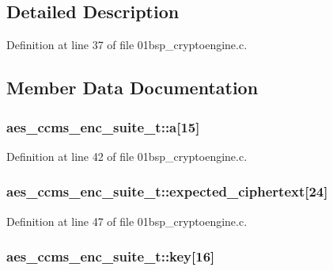 \subsection{Detailed Description}


Definition at line 37 of file 01bsp\+\_\+cryptoengine.\+c.



\subsection{Member Data Documentation}
\subsubsection[{\texorpdfstring{a}{a}}]{ aes\+\_\+ccms\+\_\+enc\+\_\+suite\+\_\+t\+::a\mbox{[}15\mbox{]}}\hypertarget{structaes__ccms__enc__suite__t_a2a300c3f4e7f798480b98527aa89895b}{}\label{structaes__ccms__enc__suite__t_a2a300c3f4e7f798480b98527aa89895b}


Definition at line 42 of file 01bsp\+\_\+cryptoengine.\+c.

\subsubsection[{\texorpdfstring{expected\+\_\+ciphertext}{expected_ciphertext}}]{ aes\+\_\+ccms\+\_\+enc\+\_\+suite\+\_\+t\+::expected\+\_\+ciphertext\mbox{[}24\mbox{]}}\hypertarget{structaes__ccms__enc__suite__t_abc88e21647d477edf3b02f00fcc8b7bb}{}\label{structaes__ccms__enc__suite__t_abc88e21647d477edf3b02f00fcc8b7bb}


Definition at line 47 of file 01bsp\+\_\+cryptoengine.\+c.

\subsubsection[{\texorpdfstring{key}{key}}]{ aes\+\_\+ccms\+\_\+enc\+\_\+suite\+\_\+t\+::key\mbox{[}16\mbox{]}}\hypertarget{structaes__ccms__enc__suite__t_aad585814cddfafdb51b93affd7b94c65}{}\label{structaes__ccms__enc__suite__t_aad585814cddfafdb51b93affd7b94c65}


